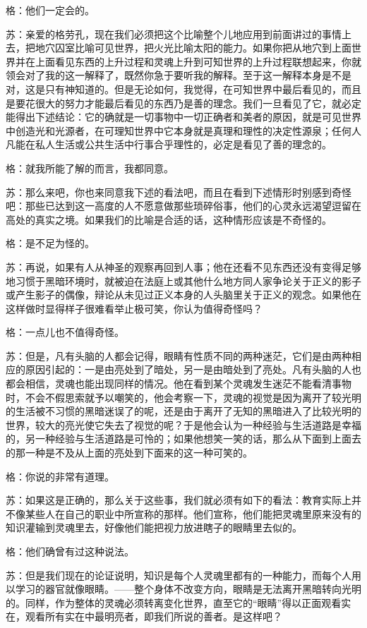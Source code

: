 \documentclass[12pt,oneside]{book}
\begin{document}
格：他们一定会的。

苏：亲爱的格劳孔，现在我们必须把这个比喻整个儿地应用到前面讲过的事情上去，把地穴囚室比喻可见世界，把火光比喻太阳的能力。如果你把从地穴到上面世界并在上面看见东西的上升过程和灵魂上升到可知世界的上升过程联想起来，你就领会对了我的这一解释了，既然你急于要听我的解释。至于这一解释本身是不是对，这是只有神知道的。但是无论如何，我觉得，在可知世界中最后看见的，而且是要花很大的努力才能最后看见的东西乃是善的理念。我们一旦看见了它，就必定能得出下述结论：它的确就是一切事物中一切正确者和美者的原因，就是可见世界中创造光和光源者，在可理知世界中它本身就是真理和理性的决定性源泉；任何人凡能在私人生活或公共生活中行事合乎理性的，必定是看见了善的理念的。

格：就我所能了解的而言，我都同意。

苏：那么来吧，你也来同意我下述的看法吧，而且在看到下述情形时别感到奇怪吧：那些已达到这一高度的人不愿意做那些琐碎俗事，他们的心灵永远渴望逗留在高处的真实之境。如果我们的比喻是合适的话，这种情形应该是不奇怪的。

格：是不足为怪的。

苏：再说，如果有人从神圣的观察再回到人事；他在还看不见东西还没有变得足够地习惯于黑暗环境时，就被迫在法庭上或其他什么地方同人家争论关于正义的影子或产生影子的偶像，辩论从未见过正义本身的人头脑里关于正义的观念。如果他在这样做时显得样子很难看举止极可笑，你认为值得奇怪吗？

格：一点儿也不值得奇怪。

苏：但是，凡有头脑的人都会记得，眼睛有性质不同的两种迷茫，它们是由两种相应的原因引起的：一是由亮处到了暗处，另一是由暗处到了亮处。凡有头脑的人也都会相信，灵魂也能出现同样的情况。他在看到某个灵魂发生迷茫不能看清事物时，不会不假思索就予以嘲笑的，他会考察一下，灵魂的视觉是因为离开了较光明的生活被不习惯的黑暗迷误了的呢，还是由于离开了无知的黑暗进入了比较光明的世界，较大的亮光使它失去了视觉的呢？于是他会认为一种经验与生活道路是幸福的，另一种经验与生活道路是可怜的；如果他想笑一笑的话，那么从下面到上面去的那一种是不及从上面的亮处到下面来的这一种可笑的。

格：你说的非常有道理。

苏：如果这是正确的，那么关于这些事，我们就必须有如下的看法：教育实际上并不像某些人在自己的职业中所宣称的那样。他们宣称，他们能把灵魂里原来没有的知识灌输到灵魂里去，好像他们能把视力放进瞎子的眼睛里去似的。

格：他们确曾有过这种说法。

苏：但是我们现在的论证说明，知识是每个人灵魂里都有的一种能力，而每个人用以学习的器官就像眼睛。——整个身体不改变方向，眼睛是无法离开黑暗转向光明的。同样，作为整体的灵魂必须转离变化世界，直至它的“眼睛”得以正面观看实在，观看所有实在中最明亮者，即我们所说的善者。是这样吧？
\end{document}
